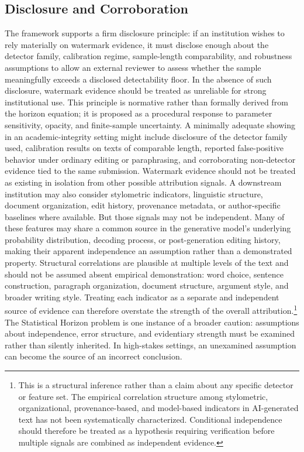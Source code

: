\documentclass[11pt]{article}
\begin{document}
\subsection{Disclosure and Corroboration}
The framework supports a firm disclosure principle: if an institution wishes to rely
materially on watermark evidence, it must disclose enough about the detector family,
calibration regime, sample-length comparability, and robustness assumptions to allow
an external reviewer to assess whether the sample meaningfully exceeds a disclosed
detectability floor. In the absence of such disclosure, watermark evidence should be
treated as unreliable for strong institutional use.
This principle is normative rather than formally derived from the horizon equation;
it is proposed as a procedural response to parameter sensitivity, opacity, and
finite-sample uncertainty. A minimally adequate showing in an academic-integrity
setting might include disclosure of the detector family used, calibration results on
texts of comparable length, reported false-positive behavior under ordinary editing
or paraphrasing, and corroborating non-detector evidence tied to the same
submission.
Watermark evidence should not be treated as existing in isolation from other
possible attribution signals. A downstream institution may also consider stylometric
indicators, linguistic structure, document organization, edit history, provenance
metadata, or author-specific baselines where available. But those signals may not be
independent. Many of these features may share a common source in the generative
model's underlying probability distribution, decoding process, or post-generation
editing history, making their apparent independence an assumption rather than a
demonstrated property. Structural correlations are plausible at multiple levels of
the text and should not be assumed absent empirical demonstration: word choice,
sentence construction, paragraph organization, document structure, argument style,
and broader writing style. Treating each indicator as a separate and independent
source of evidence can therefore overstate the strength of the overall
attribution.\footnote{This is a structural inference rather than a claim about any
specific detector or feature set. The empirical correlation structure among
stylometric, organizational, provenance-based, and model-based indicators in
AI-generated text has not been systematically characterized. Conditional
independence should therefore be treated as a hypothesis requiring verification
before multiple signals are combined as independent evidence.}
The Statistical Horizon problem is one instance of a broader caution: assumptions
about independence, error structure, and evidentiary strength must be examined
rather than silently inherited. In high-stakes settings, an unexamined assumption
can become the source of an incorrect conclusion.
\end{document}
